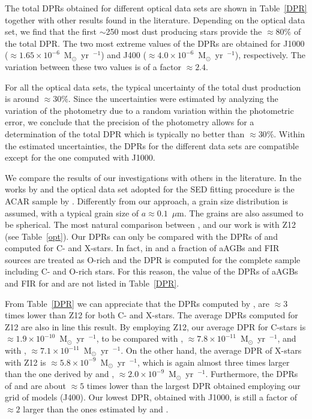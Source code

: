 \documentclass[useAMS,usenatbib]{mn2e/mn2e}
\begin{document}
{The total DPRs obtained for different optical data sets are shown in Table~\ref{DPR} together with other results found in the literature.
Depending on the optical data set, we find that the first $\sim$250 most dust producing stars provide the $\approx$80$\%$ of the total DPR. 
The two most extreme values of the DPRs are obtained for J1000 ($\approx 1.65\times10^{-6}$~M$_\odot$~yr~$^{-1}$) and J400 ($\approx 4.0\times10^{-6}$~M$_\odot$~yr~$^{-1}$), respectively. The variation between these two values is of a factor $\approx2.4$. 

For all the optical data sets, the typical uncertainty of the total dust production is around $\approx30\%$.
Since the uncertainties were estimated by analyzing the variation of the photometry due to a random variation within the photometric error, we conclude that the precision of the photometry allows for a determination of the total DPR which is typically no better than $\approx30\%$.
Within the estimated uncertainties, the DPRs for the different data sets are compatible except for the one computed with J1000. 

We compare the results of our investigations with others in the literature. 
In the works by \citet{Boyer12} and \citet{Srinivasan16} the optical data set adopted for the SED fitting procedure is the ACAR sample by \citet{Zubko96}. Differently from our approach, a grain size distribution is assumed, with a typical grain size of $a\approx0.1$~$\mu$m. The grains are also assumed to be spherical.
The most natural comparison between \citet{Boyer12}, \citet{Srinivasan16} and our work is with Z12 (see Table~\ref{opt}).
Our DPRs can only be compared with the DPRs of \citet{Boyer12} and \citet{Srinivasan16} computed for C- and X-stars. In fact, in \citet{Boyer12} and \citet{Srinivasan16} a fraction of aAGBs and FIR sources are treated as O-rich and the DPR is computed for the complete sample including C- and O-rich stars. For this reason, the value of the DPRs of aAGBs and FIR for \citet{Boyer12} and \citet{Srinivasan16} are not listed in Table~\ref{DPR}.

From Table~\ref{DPR} we can appreciate that the DPRs computed by \citet{Boyer12}, \citet{Srinivasan16} are $\approx3$ times lower than Z12 for both C- and X-stars.
The average DPRs computed for Z12 are also in line this result. By employing Z12, our average DPR for C-stars is $\approx 1.9\times 10^{-10}$~M$_\odot$~yr~$^{-1}$, to be compared with \citet{Boyer12}, $\approx 7.8\times 10^{-11}$~M$_\odot$~yr~$^{-1}$, and with \citet{Srinivasan16}, $\approx 7.1\times 10^{-11}$~M$_\odot$~yr~$^{-1}$. 
On the other hand, the average DPR of X-stars with Z12 is $\approx5.8\times 10^{-9}$~M$_\odot$~yr~$^{-1}$, which is again almost three times larger than the one derived by \citet{Boyer12} and \citet{Srinivasan16}, $\approx2.0\times 10^{-9}$~M$_\odot$~yr~$^{-1}$.
Furthermore, the DPRs of \citet{Boyer12} and \citet{Srinivasan16} are about $\approx5$ times lower than the largest DPR obtained employing our grid of models (J400). Our lowest DPR, obtained with J1000, is still a factor of $\approx2$ larger than the ones estimated by \citet{Boyer12} and \citet{Srinivasan16}.

}
\end{document}
